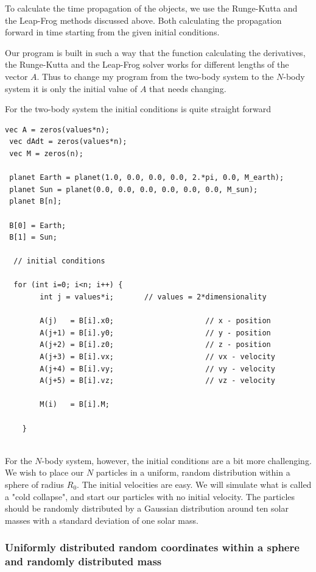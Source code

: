 \documentclass[a4paper,12pt, english]{article}
\begin{document}
To calculate the time propagation of the objects, we use the Runge-Kutta and the Leap-Frog methods discussed above. Both calculating the propagation forward in time starting from the given initial conditions. 

Our program is built in such a way that the function calculating the derivatives, the Runge-Kutta and the Leap-Frog solver works for different lengths of the vector $A$. Thus to change my program from the two-body system to the $N$-body system it is only the initial value of $A$ that needs changing.

For the two-body system the initial conditions is quite straight forward

 \begin{lstlisting}[title={Initial conditions two-body system}]
 vec A = zeros(values*n);
 vec dAdt = zeros(values*n);
 vec M = zeros(n);

 planet Earth = planet(1.0, 0.0, 0.0, 0.0, 2.*pi, 0.0, M_earth);
 planet Sun = planet(0.0, 0.0, 0.0, 0.0, 0.0, 0.0, M_sun);
 planet B[n];

 B[0] = Earth;
 B[1] = Sun;

  // initial conditions

  for (int i=0; i<n; i++) {
        int j = values*i;		// values = 2*dimensionality
       
        A(j)   = B[i].x0;                     // x - position
        A(j+1) = B[i].y0;                     // y - position
        A(j+2) = B[i].z0;                     // z - position
        A(j+3) = B[i].vx;                     // vx - velocity
        A(j+4) = B[i].vy;                     // vy - velocity
        A(j+5) = B[i].vz;                     // vz - velocity

        M(i)   = B[i].M;
        
    }
 
 \end{lstlisting}
 
 
For the $N$-body system, however, the initial conditions are a bit more challenging. We wish to place our $N$ particles in a uniform, random distribution within a sphere of radius $R_0$. The initial velocities are easy. We will simulate what is called a "cold collapse", and start our particles with no initial velocity. The particles should be randomly distributed by a Gaussian distribution around ten solar masses with a standard deviation of one solar mass.  


\subsubsection*{Uniformly distributed random coordinates within a sphere and randomly distributed mass}
\end{document}
